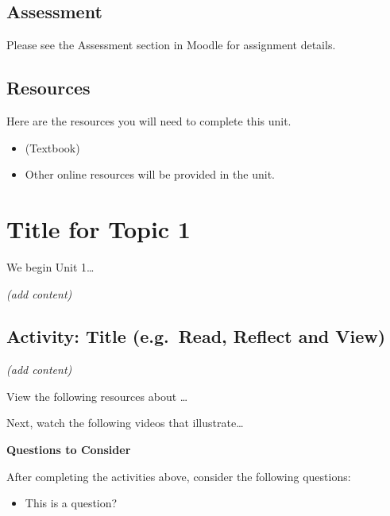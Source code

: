 \documentclass[
  letterpaper,
  DIV=11,
  numbers=noendperiod]{scrreprt}
\providecommand{\tightlist}{%
  \setlength{\itemsep}{0pt}\setlength{\parskip}{0pt}}\usepackage{longtable,booktabs,array}
\begin{document}
\subsection*{Assessment}\label{assessment}

Please see the Assessment section in Moodle for assignment details.

\subsection*{Resources}\label{resources}

Here are the resources you will need to complete this unit.

\begin{itemize}
\tightlist
\item
  (Textbook)
\item
  Other online resources will be provided in the unit.
\end{itemize}

\section{Title for Topic 1}\label{title-for-topic-1}

We begin Unit 1\ldots{}

\emph{(add content)}

\subsection*{Activity: Title (e.g.~Read, Reflect and
View)}\label{activity-title-e.g.-read-reflect-and-view}

\begin{tcolorbox}[enhanced jigsaw, colbacktitle=quarto-callout-note-color!10!white, coltitle=black, colframe=quarto-callout-note-color-frame, rightrule=.15mm, bottomrule=.15mm, title={Learning Activity}, bottomtitle=1mm, left=2mm, toprule=.15mm, opacitybacktitle=0.6, arc=.35mm, opacityback=0, toptitle=1mm, breakable, leftrule=.75mm, titlerule=0mm, colback=white]

\emph{(add content)}

View the following resources about \ldots{}

Next, watch the following videos that illustrate\ldots{}

\textbf{Questions to Consider}

After completing the activities above, consider the following questions:

\begin{itemize}
\tightlist
\item
  This is a question?
\end{itemize}

\end{tcolorbox}
\end{document}
